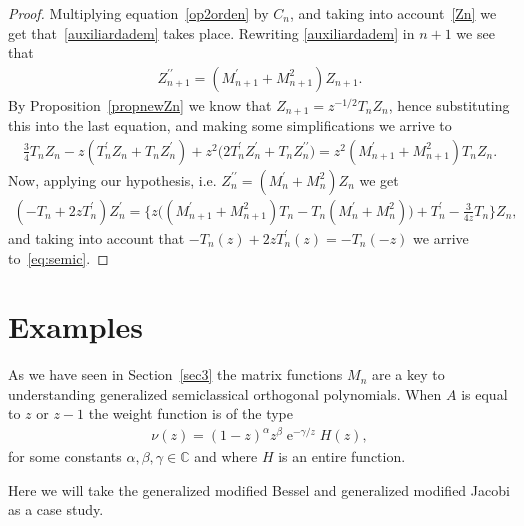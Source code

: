 \documentclass[12pt]{amsart}
\newcommand{\dde}{\operatorname e}
\begin{document}
\begin{proof}
Multiplying equation~\eqref{op2orden} by \( C_n \), and taking into account~\eqref{Zn} we get that~\eqref{auxiliardadem} takes place. Rewriting \eqref{auxiliardadem} in \( n+1 \) we see that
\begin{align*}
Z_{n+1}^{\prime\prime} = (M_{n+1}^\prime + M_{n+1}^2)Z_{n+1} .
\end{align*}
By Proposition~\ref{propnewZn} we know that \( Z_{n+1} = z^{-1/2} T_n Z_n \), hence substituting this into the last equation, and making some simplifications we arrive to
\begin{align*}
\frac 3 4 T_n Z_n - z (T_n^\prime Z_n + T_n Z_n^\prime) + z^2 \big( 2 T_n^\prime Z_n^\prime + T_n Z_n^{\prime\prime} \big) = z^2 (M_{n+1}^\prime + M_{n+1}^2) T_n Z_n .
\end{align*}
Now, applying our hypothesis, i.e. \( Z_{n}^{\prime\prime} = (M_{n}^\prime + M_{n}^2) Z_n \) we get
\begin{align*}
(-T_n + 2 z T_n^\prime) Z_n^\prime = \Big\{ z \big( (M_{n+1}^\prime + M_{n+1}^2)T_n - T_n (M_{n}^\prime + M_{n}^2) \big) + T_n^\prime - \frac 3 {4z} T_n \Big\} Z_n ,
\end{align*}
and taking into account that \( -T_n (z) + 2 z T_n^\prime (z) = - T_n (-z) \)
we arrive to~\eqref{eq:semic}.
\end{proof}


\section{Examples}\label{sec4}

As we have seen in Section~\ref{sec3} the matrix functions \( M_n \) are a key to understanding generalized semiclassical orthogonal polynomials. When \( A \) is equal to \( z \) or \( z-1 \) the weight function is of the type
\begin{align*}
 \nu (z) = (1-z)^\alpha z^\beta \dde^{-\gamma/z} H (z) ,
\end{align*} 
for some constants \( \alpha, \beta, \gamma \in \mathbb C \)
and where \( H \) is an entire function.

Here we will take the generalized modified Bessel and generalized modified Jacobi as a case study.
\end{document}
